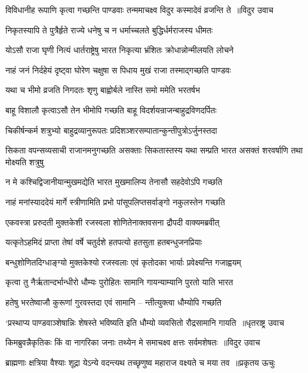 \twolineshloka
{विविधानीह रूपाणि कृत्वा गच्छन्ति पाण्डवाः}
{तन्ममाचक्ष्व विदुर कस्मादेवं व्रजन्ति ते ॥विदुर उवाच}


\twolineshloka
{निकृतस्यापि ते पुत्रैर्हृते राज्ये धनेषु च}
{न धर्माच्चलते बुद्धिर्धर्मराजस्य धीमतः}


\twolineshloka
{योऽसौ राजा घृणी नित्यं धार्तराष्ट्रेषु भारत}
{निकृत्या भ्रंशितः क्रोधान्नोन्मीलयति लोचने}


\twolineshloka
{नाहं जनं निर्दहेयं दृष्ट्वा घोरेण चक्षुषा}
{स पिधाय मुखं राजा तस्माद्गच्छति पाण्डवः}


\twolineshloka
{यथा च भीमो व्रजति निगदतः शृणु}
{बाह्वोर्बले नास्ति समो ममेति भरतर्षभ}


\twolineshloka
{बाहू विशालौ कृत्वाऽसौ तेन भीमोपि गच्छति}
{बाहू विदर्शयन्राजन्बाहुद्रविणदर्पितः}


\twolineshloka
{चिकीर्षन्कर्म शत्रुभ्यो बाहुद्रव्यानुरूपतः}
{प्रदिशञ्शरसम्पातान्कुन्तीपुत्रोऽर्जुनस्तदा}


\threelineshloka
{सिकता वपन्सव्यसाची राजानमनुगच्छति}
{असक्ताः सिकतास्तस्य यथा सम्प्रति भारत}
{असक्तं शरवर्षाणि तथा मोक्ष्यति शत्रुषु}


\twolineshloka
{न मे कश्चिद्विजानीयान्मुखमद्येति भारत}
{मुखमालिप्य तेनासौ सहदेवोऽपि गच्छति}


\twolineshloka
{नाहं मनांस्याददेयं मार्गे स्त्रीणामिति प्रभो}
{पांसूपलिप्तसर्वाङ्गो नकुलस्तेन गच्छति}


\twolineshloka
{एकवस्त्रा प्ररुदती मुक्तकेशी रजस्वला}
{शोणितेनाक्तवसना द्रौपदी वाक्यमब्रवीत्}


\twolineshloka
{यत्कृतेऽहमिदं प्राप्ता तेषां वर्षे चतुर्दशे}
{हतपत्यो हतसुता हतबन्धुजनप्रियाः}


\twolineshloka
{बन्धुशोणितदिग्धाङ्ग्यो मुक्तकेश्यो रजस्वलाः}
{एवं कृतोदका भार्याः प्रवेक्ष्यन्ति गजाह्वयम्}


\twolineshloka
{कृत्वा तु नैर्ऋतान्दर्भान्धीरो धौम्यः पुरोहितः}
{सामानि गायन्याम्यानि पुरतो याति भारत}


\threelineshloka
{हतेषु भरतेष्वाजौ कुरूणां गुरवस्तदा}
{एवं सामानि -- न्तीत्युक्त्वा धौम्योपि गच्छति}
{}


\twolineshloka
{`प्रस्थाप्य पाण्डवाञ्शेषान्निः शेषस्ते भविष्यति}
{इति धौम्यो व्यवसितो रौद्रसामानि गायति ॥धृतराष्ट्र उवाच}


\twolineshloka
{किमब्रुवन्नैकृतिकः किं वा नागरिका जनाः}
{तथ्येन मे समाचक्ष्व क्षत्तः सर्वमशेषतः ॥विदुर उवाच}


\threelineshloka
{ब्राह्मणाः क्षत्रिया वैश्याः शूद्रा येऽन्ये वदन्त्यथ}
{तच्छृणुष्व महाराज वक्ष्यते च मया तव ॥प्रकृतय ऊचुः}
{}


